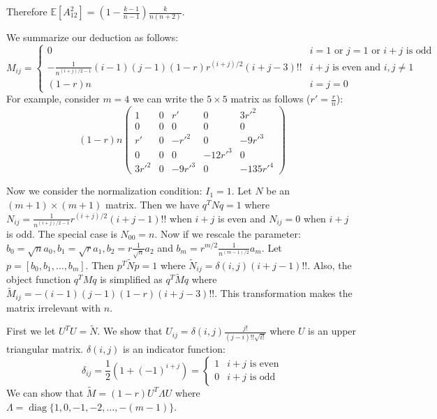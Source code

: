 \documentclass{article}
\def\E{\mathbb{E}}
\DeclareMathOperator*{\diag}{diag}
\begin{document}
Therefore $\E[A^2_{12}]=(1-\frac{k-1}{n-1}) \frac{k}{n(n+2)}$.

We summarize our deduction as follows:
\begin{equation}
M_{ij} = \begin{cases} 0 & i=1 \textrm{ or } j=1 \textrm{ or } i + j
\textrm{ is odd} \\
 -\frac{1}{n^{(i+j)/2-1}}(i-1)(j-1) (1-r)r^{(i+j)/ 2 } (i+j-3)!! & i+j
 \textrm{ is even and } i,j \neq 1 \\
(1-r)n & i=j=0
\end{cases}
\end{equation}
For example, consider $m = 4$
we can write the $ 5 \times 5 $ matrix as follows ($r'=\frac{r}{n}$):
$$
(1-r)n\begin{pmatrix}
1 & 0 & r'  & 0 & 3r'^2\\
0 & 0 & 0  & 0 & 0\\
r' &  0 & - r'^2 & 0 & -9 r'^3 \\
0 & 0 & 0 & -12r'^3 & 0 \\
3r'^2 & 0 & -9 r'^3 & 0 & -135r'^4
\end{pmatrix}
$$

Now we consider the normalization condition: $I_1 = 1$.
Let $N$ be an $(m+1) \times (m+1)$ matrix.
Then we have $q^T N q = 1$ where
$N_{ij} =\frac{1}{n^{(i+j)/2-1}}r^{(i+j) / 2} (i+j -1)!!$
when $i+j$ is even and $N_{ij} = 0$
when $i+j$ is odd.
The special case is $N_{00} = n$.
Now if we rescale the parameter:
$b_0 =  \sqrt{n}a_0, b_1 = \sqrt{r} a_1, b_2 = r \frac{1}{\sqrt{n}}a_2$
and $b_m = r^{m/2} \frac{1}{n^{(m-1)/2}}a_m$.
Let $p = [b_0, b_1, \dots, b_m]$.
Then $p^T \widetilde{N} p =1$ where
$\widetilde{N}_{ij} = \delta(i,j) (i+j -1)!!$.
Also, the object function $q^T M q$ is simplified as $q^T \widetilde{M} q$
where $\widetilde{M}_{ij} =  -(i-1)(j-1)(1-r) (i+j-3)!! $.
This transformation makes the matrix irrelevant with $n$.

First we let $U^T U = \widetilde{N}$.
We show that $U_{ij} = \delta(i,j)\frac{j!}{(j-i)!!\sqrt{i!}}$
where $U$ is an upper triangular matrix.
$\delta(i,j)$ is an indicator function:
\begin{equation}
\delta_{ij} = \frac{1}{2}(1+(-1)^{i+j})=\begin{cases}
1 & i+j \textrm{ is even} \\
0 & i+j \textrm{ is odd}
\end{cases}
\end{equation}
We can show that $\widetilde{M} = (1-r)U^T \Lambda U$ where
$\Lambda = \diag\{1,0, -1, -2, \dots, -(m-1)\}$.
\end{document}
